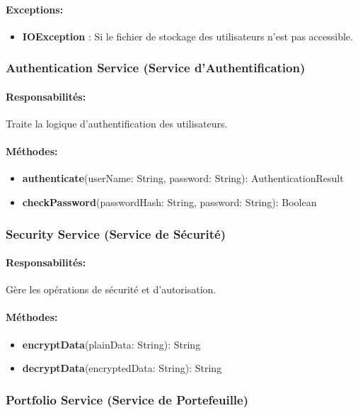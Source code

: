 \documentclass{article}
\begin{document}
\paragraph{Exceptions:}
\begin{itemize}
  \item \textbf{IOException} : Si le fichier de stockage des utilisateurs n'est pas accessible. 
\end{itemize}
\subsubsection{Authentication Service (Service d'Authentification)}
\paragraph{Responsabilités:} Traite la logique d'authentification des utilisateurs.
\paragraph{Méthodes:}
\begin{itemize}
  \item \textbf{authenticate}(userName: String, password: String): AuthenticationResult
  \item \textbf{checkPassword}(passwordHash: String, password: String): Boolean
\end{itemize}
\subsubsection{Security Service (Service de Sécurité)}
\paragraph{Responsabilités:} Gère les opérations de sécurité et d'autorisation.
\paragraph{Méthodes:}
\begin{itemize}
  \item \textbf{encryptData}(plainData: String): String
  \item \textbf{decryptData}(encryptedData: String): String
\end{itemize}
\subsubsection{Portfolio Service (Service de Portefeuille)}
\end{document}
